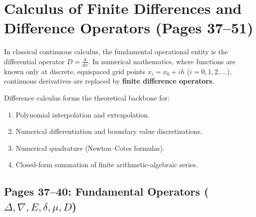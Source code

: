 \chapter{Calculus of Finite Differences and Difference Operators (Pages 37--51)}
\label{ch:finite_differences}

\begin{conceptbox}
In classical continuous calculus, the fundamental operational entity is the differential operator $D = \frac{d}{dx}$. In numerical mathematics, where functions are known only at discrete, equispaced grid points $x_i = x_0 + i h$ ($i = 0, 1, 2, \dots$), continuous derivatives are replaced by \textbf{finite difference operators}.

Difference calculus forms the theoretical backbone for:
\begin{enumerate}[noitemsep]
    \item Polynomial interpolation and extrapolation.
    \item Numerical differentiation and boundary value discretizations.
    \item Numerical quadrature (Newton--Cotes formulas).
    \item Closed-form summation of finite arithmetic-algebraic series.
\end{enumerate}
\end{conceptbox}

\section{Pages 37--40: Fundamental Operators \texorpdfstring{($\Delta, \nabla, E, \delta, \mu, D$)}{(Delta, Nabla, E, delta, mu, D)}}
\label{sec:difference_operators}

